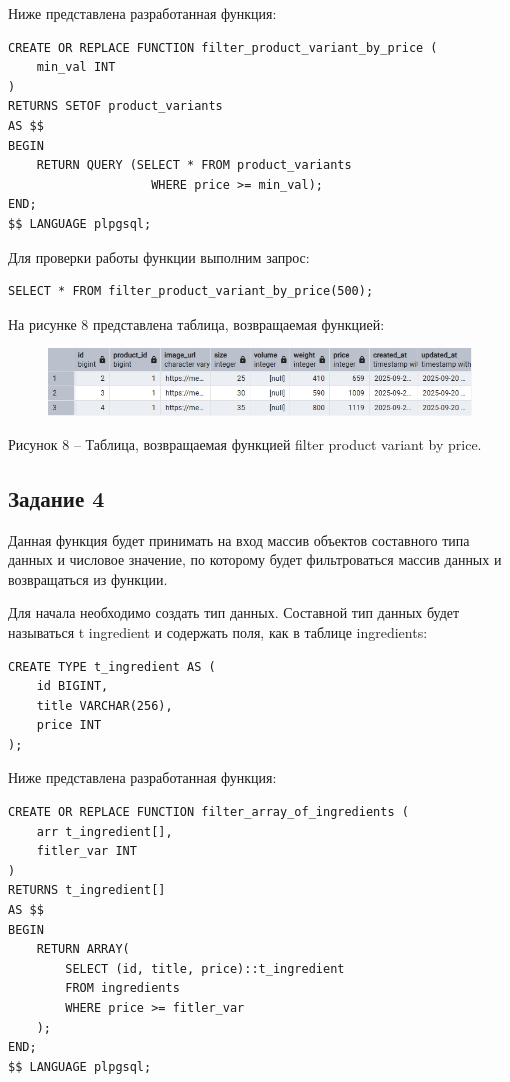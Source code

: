 \documentclass[a4paper,14pt]{extarticle}
\begin{document}
  Ниже представлена разработанная функция:

  \noindent
  \begin{Verbatim}[tabsize=4,fontsize=\small]
CREATE OR REPLACE FUNCTION filter_product_variant_by_price (
    min_val INT
)
RETURNS SETOF product_variants
AS $$
BEGIN
    RETURN QUERY (SELECT * FROM product_variants 
                    WHERE price >= min_val);
END;
$$ LANGUAGE plpgsql;
  \end{Verbatim}

  Для проверки работы функции выполним запрос:

  \noindent
  \begin{Verbatim}[tabsize=4,fontsize=\small]
SELECT * FROM filter_product_variant_by_price(500);
  \end{Verbatim}

  На рисунке 8 представлена таблица, возвращаемая функцией:

  \pagebreak
  \begin{figure}[h]
    \centering
    \includegraphics[width=1\linewidth]{img/t-3-1}
  \end{figure}
  \begin{center}
    Рисунок 8 – Таблица, возвращаемая функцией filter product variant by price.
  \end{center}

  \subsection*{Задание 4}
  Данная функция будет принимать на вход массив объектов составного типа данных и числовое значение, по которому будет фильтроваться массив данных и возвращаться из функции.

  Для начала необходимо создать тип данных. Составной тип данных будет называться t ingredient и содержать поля, как в таблице ingredients:

  \noindent
  \begin{Verbatim}[tabsize=4,fontsize=\small]
CREATE TYPE t_ingredient AS (
    id BIGINT,
    title VARCHAR(256),
    price INT
);
  \end{Verbatim}

  Ниже представлена разработанная функция:

  \noindent
  \begin{Verbatim}[tabsize=4,fontsize=\small]
CREATE OR REPLACE FUNCTION filter_array_of_ingredients (
    arr t_ingredient[],
    fitler_var INT
)
RETURNS t_ingredient[]
AS $$
BEGIN
    RETURN ARRAY(
        SELECT (id, title, price)::t_ingredient
        FROM ingredients
        WHERE price >= fitler_var
    );
END;
$$ LANGUAGE plpgsql;
  \end{Verbatim}
\end{document}
